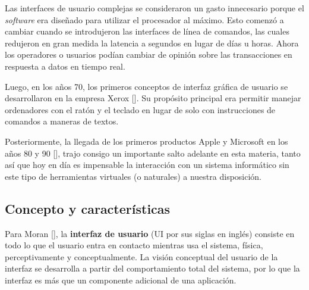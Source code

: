 Las interfaces de usuario complejas se consideraron un gasto innecesario porque el \textit{software} era diseñado para utilizar el procesador al máximo. Esto comenzó a cambiar cuando se introdujeron las interfaces de línea de comandos, las cuales redujeron en gran medida la latencia a segundos en lugar de días u horas. Ahora los operadores o usuarios podían cambiar de opinión sobre las transacciones en respuesta a datos en tiempo real.




Luego, en los años 70, los primeros conceptos de interfaz gráfica de usuario se desarrollaron en la empresa Xerox [\cite{5,7}]. Su propósito principal era permitir manejar ordenadores con el ratón y el teclado en lugar de solo con instrucciones de comandos a maneras de textos.

Posteriormente, la llegada de los primeros productos Apple y Microsoft en los años 80 y 90 [\cite{5,7}], trajo consigo un importante salto adelante en esta materia, tanto así que hoy en día es impensable la interacción con un sistema informático sin este tipo de herramientas virtuales (o naturales) a nuestra disposición.

\subsection{Concepto y características}
Para Moran [\cite{23}], la \textbf{interfaz de usuario} (UI por sus siglas en inglés) consiste en todo lo que el usuario entra en contacto mientras usa el sistema, física, perceptivamente y conceptualmente. La visión conceptual del usuario de la interfaz se desarrolla a partir del comportamiento total del sistema, por lo que la interfaz es más que un componente adicional de una aplicación.

